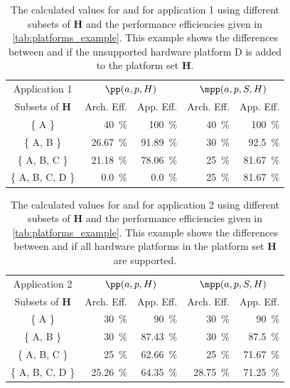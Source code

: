 \newpage
{}
\begin{table}[]
    \centering
    \begin{tabular}{c|rrrr}
        
        Application 1           & \multicolumn{2}{c}{$\pp(a, p, H)$}          & \multicolumn{2}{c}{$\mpp(a, p, S, H)$}   \\
        Subsets of $\mathbf{H}$ & Arch. Eff.           & App. Eff.            & Arch. Eff.        & App. Eff.            \\\midrule
        \{ A \}                 & \SI{40}{\percent}    & \SI{100}{\percent}   & \SI{40}{\percent} & \SI{100}{\percent}    \\
        \{ A, B \}              & \SI{26.67}{\percent} & \SI{91.89}{\percent} & \SI{30}{\percent} & \SI{92.5}{\percent}  \\
        \{ A, B, C \}           & \SI{21.18}{\percent} & \SI{78.06}{\percent} & \SI{25}{\percent} & \SI{81.67}{\percent} \\
        \{ A, B, C, D \}        & \SI{0.0}{\percent}   & \SI{0.0}{\percent}   & \SI{25}{\percent} & \SI{81.67}{\percent} 
    \end{tabular}
    \caption{%
    The calculated values for \pp and \mpp for application 1 using different subsets of $\mathbf{H}$ and the performance efficiencies given in \autoref{tab:platforms_example}. 
    This example shows the differences between \pp and \mpp if the unsupported hardware platform D is added to the platform set $\mathbf{H}$.
    }
\end{table}

\begin{table}[]
    \centering
    \begin{tabular}{c|rrrr}
        Application 2           & \multicolumn{2}{c}{$\pp(a, p, H)$}          & \multicolumn{2}{c}{$\mpp(a, p, S, H)$}      \\
        Subsets of $\mathbf{H}$ & Arch. Eff.           & App. Eff.            & Arch. Eff.           & App. Eff.            \\\midrule
        \{ A \}                 & \SI{30}{\percent}    & \SI{90}{\percent}    & \SI{30}{\percent}    & \SI{90}{\percent}    \\
        \{ A, B \}              & \SI{30}{\percent}    & \SI{87.43}{\percent} & \SI{30}{\percent}    & \SI{87.5}{\percent}  \\
        \{ A, B, C \}           & \SI{25}{\percent}    & \SI{62.66}{\percent} & \SI{25}{\percent}    & \SI{71.67}{\percent} \\
        \{ A, B, C, D \}        & \SI{25.26}{\percent} & \SI{64.35}{\percent} & \SI{28.75}{\percent} & \SI{71.25}{\percent}
    \end{tabular}
    \caption{%
    The calculated values for \pp and \mpp for application 2 using different subsets of $\mathbf{H}$ and the performance efficiencies given in \autoref{tab:platforms_example}. 
    This example shows the differences between \pp and \mpp if all hardware platforms in the platform set $\mathbf{H}$ are supported.
    }
\end{table}